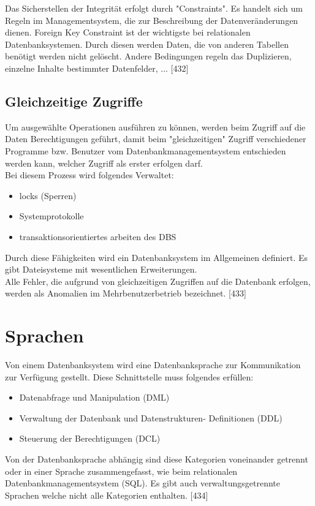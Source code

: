 \documentclass[12pt,a4paper]{report}
\begin{document}
\begin{onehalfspace}
Das Sicherstellen der Integrität erfolgt durch "{}Constraints"{}. Es handelt sich um Regeln im Managementsystem, die zur Beschreibung der Datenveränderungen dienen. Foreign Key Constraint ist der wichtigste bei relationalen Datenbanksystemen. Durch diesen werden Daten, die von anderen Tabellen benötigt werden nicht gelöscht. Andere Bedingungen regeln das Duplizieren, einzelne Inhalte bestimmter Datenfelder, ...
[432]
\subsection{Gleichzeitige Zugriffe}
Um ausgewählte Operationen ausführen zu können, werden beim Zugriff auf die Daten Berechtigungen geführt, damit beim "{}gleichzeitigen"{} Zugriff verschiedener Programme bzw. Benutzer vom Datenbankmanagementsystem entschieden werden kann, welcher Zugriff als erster erfolgen darf.\\
Bei diesem Prozess wird folgendes Verwaltet:
\begin{itemize}
\item locks (Sperren)
\item Systemprotokolle
\item transaktionsorientiertes arbeiten des DBS
\end{itemize}
Durch diese Fähigkeiten wird ein Datenbanksystem im Allgemeinen definiert. Es gibt Dateisysteme mit wesentlichen Erweiterungen.\\

Alle Fehler, die aufgrund von gleichzeitigen Zugriffen auf die Datenbank erfolgen, werden als Anomalien im Mehrbenutzerbetrieb bezeichnet. [433]

\section{Sprachen}
Von einem Datenbanksystem wird eine Datenbanksprache zur Kommunikation zur Verfügung gestellt. Diese Schnittstelle muss folgendes erfüllen:
\begin{itemize}
\item Datenabfrage und Manipulation (DML)
\item Verwaltung der Datenbank und Datenstrukturen- Definitionen (DDL)
\item Steuerung der Berechtigungen (DCL)
\end{itemize}
Von der Datenbanksprache abhängig sind diese Kategorien voneinander getrennt oder in einer Sprache zusammengefasst, wie beim relationalen Datenbankmanagementsystem (SQL). Es gibt auch verwaltungsgetrennte Sprachen welche nicht alle Kategorien enthalten. [434]

\end{onehalfspace}
\end{document}
